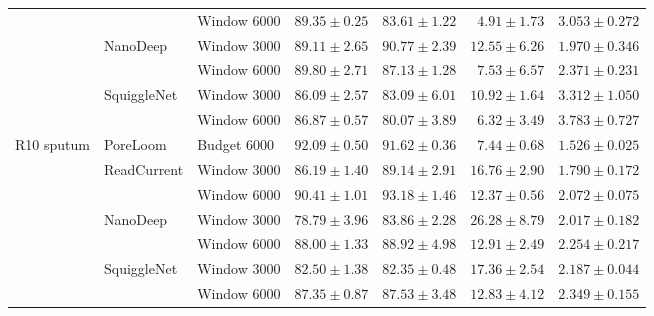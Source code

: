 \begin{tabular}{@{}lllrrrr@{}}
 &  & Window 6000 & $89.35 \pm 0.25$ & $83.61 \pm 1.22$ & $4.91 \pm 1.73$ & $3.053 \pm 0.272$\\
 & NanoDeep & Window 3000 & $89.11 \pm 2.65$ & $90.77 \pm 2.39$ & $12.55 \pm 6.26$ & $1.970 \pm 0.346$\\
 &  & Window 6000 & $89.80 \pm 2.71$ & $87.13 \pm 1.28$ & $7.53 \pm 6.57$ & $2.371 \pm 0.231$\\
 & SquiggleNet & Window 3000 & $86.09 \pm 2.57$ & $83.09 \pm 6.01$ & $10.92 \pm 1.64$ & $3.312 \pm 1.050$\\
 &  & Window 6000 & $86.87 \pm 0.57$ & $80.07 \pm 3.89$ & $6.32 \pm 3.49$ & $3.783 \pm 0.727$\\
\addlinespace
R10 sputum & PoreLoom & Budget 6000 & $\mathbf{92.09 \pm 0.50}$ & $91.62 \pm 0.36$ & $\mathbf{7.44 \pm 0.68}$ & $\mathbf{1.526 \pm 0.025}$\\
 & ReadCurrent & Window 3000 & $86.19 \pm 1.40$ & $89.14 \pm 2.91$ & $16.76 \pm 2.90$ & $1.790 \pm 0.172$\\
 &  & Window 6000 & $90.41 \pm 1.01$ & $\mathbf{93.18 \pm 1.46}$ & $12.37 \pm 0.56$ & $2.072 \pm 0.075$\\
 & NanoDeep & Window 3000 & $78.79 \pm 3.96$ & $83.86 \pm 2.28$ & $26.28 \pm 8.79$ & $2.017 \pm 0.182$\\
 &  & Window 6000 & $88.00 \pm 1.33$ & $88.92 \pm 4.98$ & $12.91 \pm 2.49$ & $2.254 \pm 0.217$\\
 & SquiggleNet & Window 3000 & $82.50 \pm 1.38$ & $82.35 \pm 0.48$ & $17.36 \pm 2.54$ & $2.187 \pm 0.044$\\
 &  & Window 6000 & $87.35 \pm 0.87$ & $87.53 \pm 3.48$ & $12.83 \pm 4.12$ & $2.349 \pm 0.155$\\
\bottomrule
\end{tabular}
\endgroup

